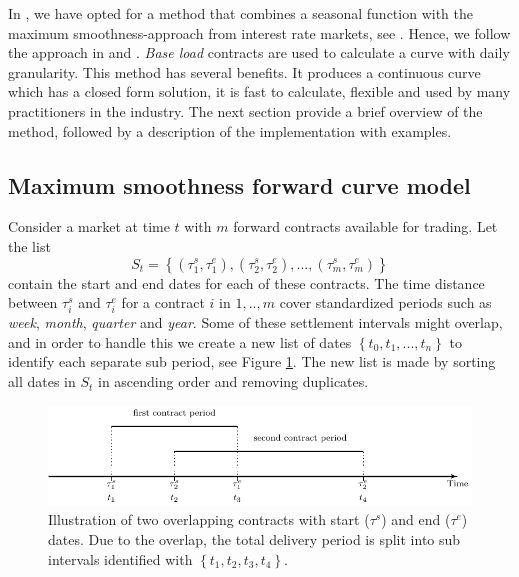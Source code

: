 In , we have opted for a method that combines a seasonal function with the maximum smoothness-approach from interest rate markets, see \citet{adams1994fitting}. Hence, we follow the approach in \citet{ollmar2003analysis} and \citet{benth2007extracting}. \textit{Base load} contracts are used to calculate a curve with daily granularity. This method has several benefits. It produces a continuous curve which has a closed form solution, it is fast to calculate, flexible and used by many practitioners in the industry. The next section provide a brief overview of the method, followed by a description of the  implementation with examples.


\subsection{Maximum smoothness forward curve model}
Consider a market at time $t$ with $m$ forward contracts available for trading. Let the list
\begin{equation*}
S_t=\left\{{(\tau^s_1,\tau^e_1),(\tau^s_2,\tau^e_2),...,(\tau^s_m,\tau^e_m)}\right\}
\end{equation*}
contain the start and end dates for each of these contracts. The time distance between $\tau^s_i$ and $\tau^e_i$ for a contract $i$ in $1, .., m$ cover standardized periods such as \textit{week}, \textit{month}, \textit{quarter} and \textit{year}. Some of these settlement intervals might overlap, and in order to handle this we create a new list of dates $\left\{t_0,t_1,...,t_n\right\}$ to identify each separate sub period, see Figure \ref{fig:timeline}. The new list is made by sorting all dates in $S_t$ in ascending order and removing duplicates.

\begin{figure}[ht!]
\centering
\includegraphics [scale = 1] {timeline.pdf}
\caption{Illustration of two overlapping contracts with start ($\tau^s$) and end ($\tau^e$) dates. Due to the overlap, the total delivery period is split into sub intervals identified with $\left\{t_1,t_2,t_3,t_4\right\}$.}
\label{fig:timeline}
\end{figure}

